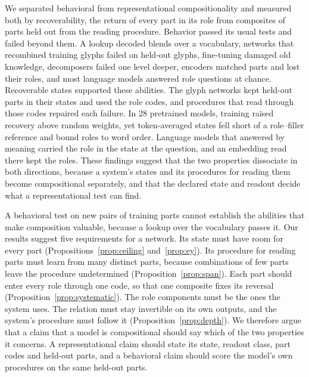 \documentclass[10pt]{article}
\theoremstyle{plain}
\theoremstyle{remark}
\begin{document}
We separated behavioral from representational compositionality and measured both by recoverability, the return of every part in its role from composites of parts held out from the reading procedure. Behavior passed its usual tests and failed beyond them. A lookup decoded blends over a vocabulary, networks that recombined training glyphs failed on held-out glyphs, fine-tuning damaged old knowledge, decomposers failed one level deeper, encoders matched parts and lost their roles, and most language models answered role questions at chance. Recoverable states supported these abilities. The glyph networks kept held-out parts in their states and used the role codes, and procedures that read through those codes repaired each failure. In 28 pretrained models, training raised recovery above random weights, yet token-averaged states fell short of a role--filler reference and bound roles to word order. Language models that answered by meaning carried the role in the state at the question, and an embedding read there kept the roles. These findings suggest that the two properties dissociate in both directions, because a system's states and its procedures for reading them become compositional separately, and that the declared state and readout decide what a representational test can find.

A behavioral test on new pairs of training parts cannot establish the abilities that make composition valuable, because a lookup over the vocabulary passes it. Our results suggest five requirements for a network. Its state must have room for every part (Propositions~\ref{prop:ceiling} and~\ref{prop:ey}). Its procedure for reading parts must learn from many distinct parts, because combinations of few parts leave the procedure undetermined (Proposition~\ref{prop:span}). Each part should enter every role through one code, so that one composite fixes its reversal (Proposition~\ref{prop:systematic}). The role components must be the ones the system uses. The relation must stay invertible on its own outputs, and the system's procedure must follow it (Proposition~\ref{prop:depth}). We therefore argue that a claim that a model is compositional should say which of the two properties it concerns. A representational claim should state its state, readout class, part codes and held-out parts, and a behavioral claim should score the model's own procedures on the same held-out parts.
\end{document}
